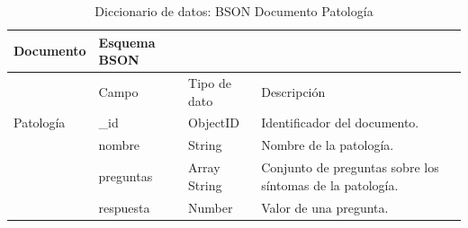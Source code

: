 \begin{table}[htpb]
\centering
\begin{tabularx}{\textwidth}{|l|X|X|X|X|}
\hline
Documento         & Esquema BSON &              &                                                           \\ \hline
                  & Campo        & Tipo de dato & Descripción                                               \\ \hline
Patología         & \_id         & ObjectID     & Identificador del documento.                              \\ \hline
\multirow{3}{*}{} & nombre       & String       & Nombre de la patología.                                   \\ \cline{2-4} 
                  & preguntas    & Array String & Conjunto de preguntas sobre los síntomas de la patología. \\ \cline{2-4} 
                  & respuesta    & Number       & Valor de una pregunta.                                    \\ \hline
\end{tabularx}
\caption{Diccionario de datos: BSON Documento Patología}
\label{fig:dic_datos_BSON_3}
\end{table}

